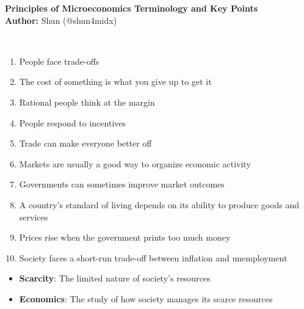 \documentclass[12pt,a4paper]{article}
\begin{document}
\begin{center}
  {\Large \bf Principles of Microeconomics Terminology and Key Points}\\[8pt]
  \textbf{Author:} Shun (@shun4midx)
\end{center}


\noindent {} \\
\begin{enumerate}
    \item People face trade-offs
    \item The cost of something is what you give up to get it
    \item Rational people think at the margin
    \item People respond to incentives
    
    \medskip
    \hspace{-\leftmargin}\noindent{}
    \medskip
    \item Trade can make everyone better off
    \item Markets are usually a good way to organize economic activity
    \item Governments can sometimes improve market outcomes
    
    \medskip
    \hspace{-\leftmargin}\noindent{}
    \medskip
    \item A country's standard of living depends on its ability to produce goods and services
    \item Prices rise when the government prints too much money
    \item Society faces a short-run trade-off between inflation and unemployment
\end{enumerate}

\begin{itemize}
    \item \textbf{Scarcity}: The limited nature of society's resources
    \item \textbf{Economics}: The study of how society manages its scarce resources
\end{itemize}
\end{document}

